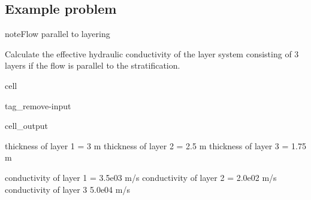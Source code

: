 \documentclass[letterpaper,10pt,english]{jupyterBook}
\begin{document}
\subsection{Example problem}
\label{\detokenize{content/flow/L5/15_het_iso:example-problem}}
\begin{sphinxadmonition}{note}{Flow parallel to layering}

\sphinxAtStartPar
Calculate the effective hydraulic conductivity of the layer system consisting of 3 layers if the flow is parallel to the stratification.
\end{sphinxadmonition}

\begin{sphinxuseclass}{cell}
\begin{sphinxuseclass}{tag_remove-input}\begin{sphinxVerbatimOutput}

\begin{sphinxuseclass}{cell_output}
\begin{sphinxVerbatim}[commandchars=\\\{\}]

thickness of layer 1 = 3 m
thickness of layer 2 = 2.5 m
thickness of layer 3 = 1.75 m

conductivity of layer 1 = 3.5e\PYGZhy{}03 m/s
conductivity of layer 2 = 2.0e\PYGZhy{}02 m/s
conductivity of layer 3 5.0e\PYGZhy{}04 m/s
\end{sphinxVerbatim}

\end{sphinxuseclass}\end{sphinxVerbatimOutput}

\end{sphinxuseclass}
\end{sphinxuseclass}
\end{document}
